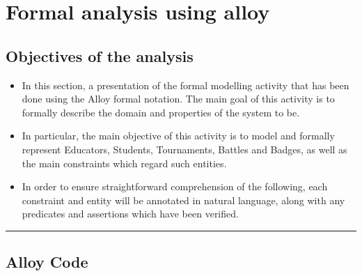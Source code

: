 \documentclass{Configuration_Files/Template}
\begin{document}
\chapter{Formal analysis using alloy}

\section{Objectives of the analysis}

\begin{itemize}
\item In this section, a presentation of the formal modelling activity that has been done using the Alloy formal notation. The main goal of this activity is to formally describe the domain and properties of the system to be.
\item In particular, the main objective of this activity is to model and formally represent Educators, Students, Tournaments, Battles and Badges, as well as the main constraints which regard such entities.
\item In order to ensure straightforward comprehension of the following, each constraint and entity will be annotated in natural language, along with any predicates and assertions which have been verified.
\end{itemize}

{\color{bluepoli}\rule{\linewidth}{0.1pt}}

\section{Alloy Code}
\end{document}
